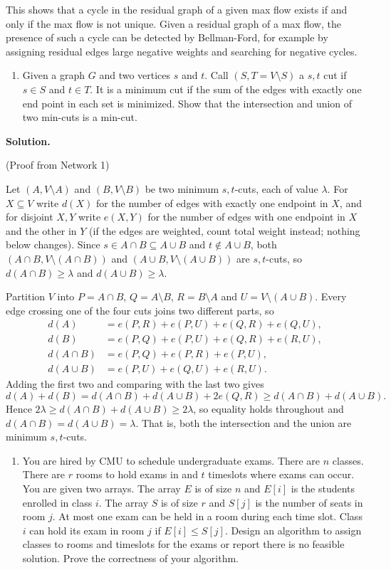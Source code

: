 \documentclass[11pt,letterpaper]{article}
\theoremstyle{definition}
\newcommand{\solution}{\medskip\noindent\textbf{Solution.}\par\medskip}
\begin{document}
This shows that a cycle in the residual graph of a given max flow exists if and only if the max flow is not unique.
Given a residual graph of a max flow, the presence of such a cycle can be detected by Bellman-Ford, for example by assigning residual edges large negative weights and searching for negative cycles.


\begin{enumerate}[resume=q]
\item Given a graph $G$ and two vertices $s$ and $t$. Call $(S, T = V \setminus S)$ a $s,t$ cut if $s \in S$ and $t \in T$. It is a minimum cut if the sum of the edges with exactly one end point in each set is minimized. Show that the intersection and union of two min-cuts is a min-cut.
\end{enumerate}

\solution

(Proof from Network 1)

Let $(A, V\setminus A)$ and $(B, V\setminus B)$ be two minimum $s,t$-cuts, each of value $\lambda$.
For $X \subseteq V$ write $d(X)$ for the number of edges with exactly one endpoint in $X$, and for disjoint $X,Y$ write $e(X,Y)$ for the number of edges with one endpoint in $X$ and the other in $Y$ (if the edges are weighted, count total weight instead; nothing below changes).
Since $s \in A\cap B \subseteq A\cup B$ and $t \notin A\cup B$, both $(A\cap B, V\setminus(A\cap B))$ and $(A\cup B, V\setminus(A\cup B))$ are $s,t$-cuts, so $d(A\cap B) \geq \lambda$ and $d(A\cup B) \geq \lambda$.

Partition $V$ into $P = A\cap B$, $Q = A\setminus B$, $R = B\setminus A$ and $U = V\setminus(A\cup B)$.
Every edge crossing one of the four cuts joins two different parts, so
\begin{align*}
d(A) &= e(P,R) + e(P,U) + e(Q,R) + e(Q,U), \\
d(B) &= e(P,Q) + e(P,U) + e(Q,R) + e(R,U), \\
d(A\cap B) &= e(P,Q) + e(P,R) + e(P,U), \\
d(A\cup B) &= e(P,U) + e(Q,U) + e(R,U).
\end{align*}
Adding the first two and comparing with the last two gives
\[
d(A) + d(B) = d(A\cap B) + d(A\cup B) + 2e(Q,R) \geq d(A\cap B) + d(A\cup B).
\]
Hence $2\lambda \geq d(A\cap B) + d(A\cup B) \geq 2\lambda$, so equality holds throughout and $d(A\cap B) = d(A\cup B) = \lambda$.
That is, both the intersection and the union are minimum $s,t$-cuts.


\begin{enumerate}[resume=q]
\item You are hired by CMU to schedule undergraduate exams. There are $n$ classes. There are $r$ rooms to hold exams in and $t$ timeslots where exams can occur. You are given two arrays. The array $E$ is of size $n$ and $E[i]$ is the students enrolled in class $i$. The array $S$ is of size $r$ and $S[j]$ is the number of seats in room $j$. At most one exam can be held in a room during each time slot. Class $i$ can hold its exam in room $j$ if $E[i] \leq S[j]$. Design an algorithm to assign classes to rooms and timeslots for the exams or report there is no feasible solution. Prove the correctness of your algorithm.
\end{enumerate}
\end{document}
